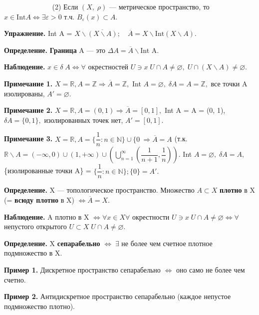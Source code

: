 \documentclass[12pt,a4paper]{article}
\begin{document}
$\quad \quad \quad \quad \quad \quad \; \;$ (2) Если $(X, \; \rho)$ --- метрическое пространство, то $x \in \text{Int} A \Leftrightarrow \exists \varepsilon > 0$ т.ч. $B_{\varepsilon}(x) \subset A.$ 

\textbf{Упражнение.} Int A = $X \backslash \overline{(X \backslash A)}; \quad \overline{A} = X \backslash \text{Int}(X \backslash A).$


\textbf{Определение.} \textbf{Граница} A --- это $\Delta A = \overline{A} \backslash$Int A. 

\textbf{Наблюдение.} $x \in \delta \; A \Leftrightarrow \forall$ окрестностей $U \ni x \; U\cap A \neq \varnothing, \; U \cap (X \backslash A) \neq \varnothing.$

\textbf{Примечание 1.} $X = \mathbb{R}, A = \mathbb{Z} \Rightarrow \overline{A} = \mathbb{Z},$ Int $A = \varnothing, \; \delta A = A = \mathbb{Z},$ все точки A изолированы, $A' = \varnothing.$ 

\textbf{Примечание 2.} $X = \mathbb{R}, A = (0, 1) \Rightarrow \overline{A} = [0, 1],$ Int A = A = (0, 1), $\delta A = \{0, 1\},$ изолированных точек нет, $A' = [0, 1].$

\textbf{Примечание 3.} $X = \mathbb{R}, A = \{\dfrac{1}{n}: n \in \mathbb{N}\} \cup \{0\ \Rightarrow \overline{A} = A$ (т.к. $\mathbb{R} \backslash A = (-\infty, 0) \cup (1, +\infty) \cup (\bigcup^{\infty}_{n = 1} (\dfrac{1}{n + 1}, \dfrac{1}{n})).$ Int $A = \varnothing, \; \delta A = A,$ \{изолированные точки A\} = $\{\dfrac{1}{n}: n \in \mathbb{N}\}; \{0\} = A'.$ 

\textbf{Определение.} X --- топологическое пространство. Множество $A \subset X$ \textbf{плотно} в X (= \textbf{всюду плотно} в X) $\Leftrightarrow \overline{A} = X.$ 

\textbf{Наблюдение.} A плотно в X $\Leftrightarrow \forall x \in X \forall$ окрестности $U \ni x \; U \cap A \neq \varnothing \Leftrightarrow \forall$ непустого открытого $U \subset X \; U \cap A \neq \varnothing.$ 

\textbf{Определение.} X \textbf{сепарабельно} $\Leftrightarrow \; \exists$ не более чем счетное плотное подмножество в X. 

\textbf{Пример 1.} Дискретное пространство сепарабельно $\Leftrightarrow$ оно само не более чем счетно. 

\textbf{Пример 2.} Антидискретное пространство сепарабельно (каждое непустое подмножество плотно). 
\end{document}

